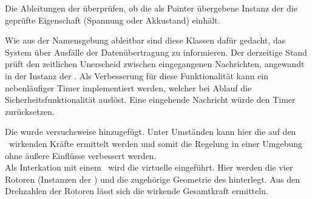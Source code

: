 Die Ableitungen der  überprüfen, ob die als Pointer übergebene Instanz der  die geprüfte Eigenschaft (Spannung oder Akkustand) einhält.


\clearpage
{}
Wie aus der Namensgebung ableitbar sind diese Klassen dafür gedacht, das System über Ausfälle der Datenübertragung zu informieren.
Der derzeitige Stand prüft den zeitlichen Unerscheid zwischen eingegangenen Nachrichten, angewandt in der Instanz der .
Als Verbesserung für diese Funktionalität kann ein nebenläufiger Timer implementiert werden, welcher bei Ablauf die Sicherheitsfunktionalität auslöst. Eine eingehende Nachricht würde den Timer zurücksetzen.


Die  wurde versuchsweise hinzugefügt. Unter Umständen kann hier die auf den \Quad\ wirkenden Kräfte ermittelt werden und somit die Regelung in einer Umgebung ohne äußere Einflüsse verbessert werden.\\
Als Interkation mit einem \Quad\ wird die virtuelle  eingeführt. Hier werden die vier Rotoren (Instanzen der ) und die zugehörige Geometrie des \Quad[s] hinterlegt. Aus den Drehzahlen der Rotoren lässt sich die wirkende Gesamtkraft ermitteln.\\


